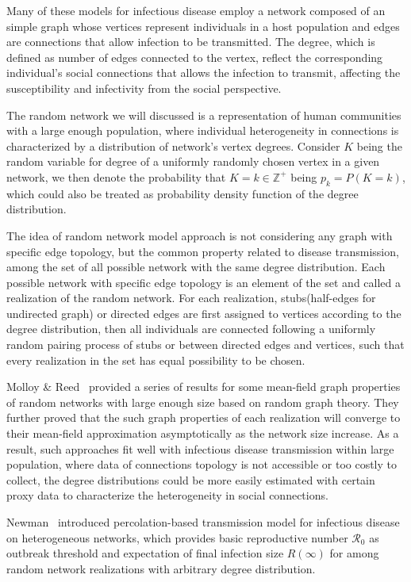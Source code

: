 \documentclass[12pt]{article}
\theoremstyle{plain}
\theoremstyle{definition}
\begin{document}
Many of these models for infectious disease employ a network composed of an simple graph whose vertices represent individuals in a host population and edges are connections that allow infection to be transmitted. 
The degree, which is defined as number of edges connected to the vertex, reflect the corresponding individual's social connections that allows the infection to transmit, affecting the susceptibility and infectivity from the social perspective.

The random network we will discussed is a representation of human communities with a large enough population, where individual heterogeneity in connections is characterized by a distribution of network's vertex degrees.
Consider $K$ being the random variable for degree of a uniformly randomly chosen vertex in a given network, we then denote the probability that $K=k \in \mathbb{Z}^+$ being $p_k=P(K=k)$, which could also be treated as probability density function of the degree distribution. 

The idea of random network model approach is not considering any graph with specific edge topology, but the common property related to disease transmission, among the set of all possible network with the same degree distribution.
Each possible network with specific edge topology is an element of the set and called a realization of the random network.
For each realization, stubs(half-edges for undirected graph) or directed edges are first assigned to vertices according to the degree distribution, then all individuals are connected following a uniformly random pairing process of stubs or between directed edges and vertices, such that every realization in the set has equal possibility to be chosen.

Molloy \& Reed~\cite{MolloyReed:1995, MolloyReed:1998} provided a series of results for some mean-field graph properties of random networks with large enough size based on random graph theory. 
They further proved that the such graph properties of each realization will converge to their mean-field approximation asymptotically as the network size increase. 
As a result, such approaches fit well with infectious disease transmission within large population, where data of connections topology is not accessible or too costly to collect, the degree distributions could be more easily estimated with certain proxy data to characterize the heterogeneity in social connections. 

Newman~\cite{Newman:2002,Newman:2003, Newman:2010} introduced percolation-based transmission model for infectious disease on heterogeneous networks, which provides basic reproductive number $\mathcal{R}_0$ as outbreak threshold and expectation of final infection size $R(\infty)$ for among random network realizations with arbitrary degree distribution.
\end{document}
